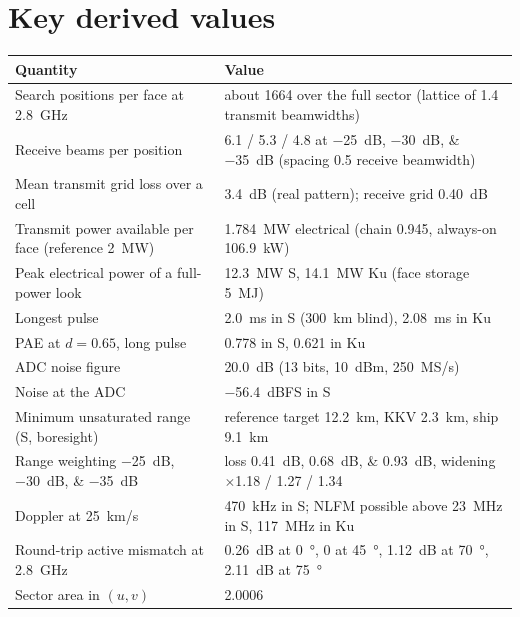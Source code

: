 \documentclass[11pt,a4paper]{article}
\begin{document}
\appendix
\section{Key derived values}
\begin{center}
\begin{tabularx}{\linewidth}{@{}lL@{}}
\toprule
Quantity & Value\\
\midrule
Search positions per face at \SI{2.8}{GHz} & about \num{1664} over the full sector (lattice of 1.4 transmit
beamwidths)\\
Receive beams per position & 6.1 / 5.3 / 4.8 at \SIlist{-25;-30;-35}{dB} (spacing 0.5 receive beamwidth)\\
Mean transmit grid loss over a cell & \SI{3.4}{dB} (real pattern); receive grid \SI{0.40}{dB}\\
Transmit power available per face (reference \SI{2}{MW}) & \SI{1.784}{MW} electrical (chain 0.945, always-on
\SI{106.9}{kW})\\
Peak electrical power of a full-power look & \SI{12.3}{MW} S, \SI{14.1}{MW} Ku (face storage \SI{5}{MJ})\\
Longest pulse & \SI{2.0}{ms} in S (\SI{300}{km} blind), \SI{2.08}{ms} in Ku\\
PAE at $d=0.65$, long pulse & 0.778 in S, 0.621 in Ku\\
ADC noise figure & \SI{20.0}{dB} (13 bits, \SI{+10}{dBm}, \SI{250}{MS/s})\\
Noise at the ADC & \SI{-56.4}{dBFS} in S\\
Minimum unsaturated range (S, boresight) & reference target \SI{12.2}{km}, KKV \SI{2.3}{km}, ship \SI{9.1}{km}\\
Range weighting \SIlist{-25;-30;-35}{dB} & loss \SIlist{0.41;0.68;0.93}{dB}, widening $\times$1.18 / 1.27 / 1.34\\
Doppler at \SI{25}{km/s} & \SI{470}{kHz} in S; NLFM possible above \SI{23}{MHz} in S, \SI{117}{MHz} in Ku\\
Round-trip active mismatch at \SI{2.8}{GHz} & \SI{0.26}{dB} at \SI{0}{\degree}, 0 at \SI{45}{\degree},
\SI{1.12}{dB} at \SI{70}{\degree}, \SI{2.11}{dB} at \SI{75}{\degree}\\
Sector area in $(u,v)$ & 2.0006\\
\bottomrule
\end{tabularx}
\end{center}
\end{document}
